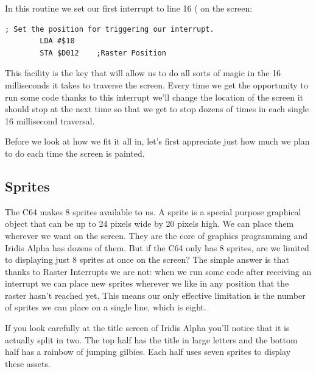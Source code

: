 In this routine we set our first interrupt to line 16 ( on the screen:

\begin{lstlisting}[caption=In \icode{InitializeSpritesAndInterruptsForTitleScreen}]
        ; Set the position for triggering our interrupt.
        LDA #$10
        STA $D012    ;Raster Position
\end{lstlisting}

This facility is the key that will allow us to do all sorts of magic in the 16 milliseconds
it takes to traverse the screen. Every time we get the opportunity to run some code thanks
to this interrupt we'll change the location of the screen it should stop at the next time
so that we get to stop dozens of times in each single 16 millisecond traversal.

Before we look at how we fit it all in, let's first appreciate just how much we plan to
do each time the screen is painted.

\subsection{Sprites}
The C64 makes 8 sprites available to us. A sprite is a special purpose graphical object that
can be up to 24 pixels wide by 20 pixels high. We can place them wherever we want on the
screen. They are the core of graphics programming and Iridis Alpha has dozens of them. But
if the C64 only has 8 sprites, are we limited to displaying just 8 sprites at once on the
screen? The simple answer is that thanks to Raster Interrupts we are not: when we run
some code after receiving an interrupt we can place new sprites wherever we like in any
position that the raster hasn't reached yet. This means our only effective limitation is
the number of sprites we can place on a single line, which is eight. 

If you look carefully at the title screen of Iridis Alpha you'll notice that it is actually
split in two. The top half has the title in large letters and the bottom half has a rainbow
of jumping gilbies. Each half uses seven sprites to display these assets.


